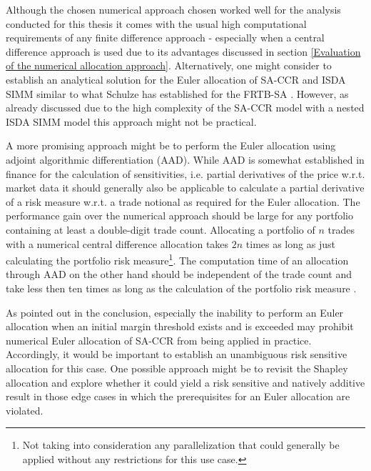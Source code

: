\documentclass[../Thesis_AHoecherl.tex]{subfiles}
\begin{document}
Although the chosen numerical approach chosen worked well for the analysis conducted for this thesis it comes with the usual high computational requirements of any finite difference approach - especially when a central difference approach is used due to its advantages discussed in section \ref{Evaluation of the numerical allocation approach}.
Alternatively, one might consider to establish an analytical solution for the Euler allocation of \gls{SA-CCR} and \gls{ISDA SIMM} similar to what Schulze has established for the \gls{FRTB-SA} \cite{schulze2018capital}.
However, as already discussed due to the high complexity of the \gls{SA-CCR} model with a nested \gls{ISDA SIMM} model this approach might not be practical.

A more promising approach might be to perform the Euler allocation using adjoint algorithmic differentiation (\gls{AAD}). 
While \gls{AAD} is somewhat established in finance for the calculation of sensitivities, i.e. partial derivatives of the price w.r.t. market data \cite{giles2006smoking} it should generally also be applicable to calculate a partial derivative of a risk measure w.r.t. a trade notional as required for the Euler allocation.
The performance gain over the numerical approach should be large for any portfolio containing at least a double-digit trade count.
Allocating a portfolio of $n$ trades with a numerical central difference allocation takes $2n$ times as long as just calculating the portfolio risk measure\footnote{Not taking into consideration any parallelization that could generally be applied without any restrictions for this use case.}.
The computation time of an allocation through \gls{AAD} on the other hand should be independent of the trade count and take less then ten times as long as the calculation of the portfolio risk measure \cite{AdaptivAAD}.

As pointed out in the conclusion, especially the inability to perform an Euler allocation when an initial margin threshold exists and is exceeded may prohibit numerical Euler allocation of \gls{SA-CCR} from being applied in practice.
Accordingly, it would be important to establish an unambiguous risk sensitive allocation for this case. One possible approach might be to revisit the Shapley allocation and explore whether it could yield a risk sensitive and natively additive result in those edge cases in which the prerequisites for an Euler allocation are violated.


\end{document}
